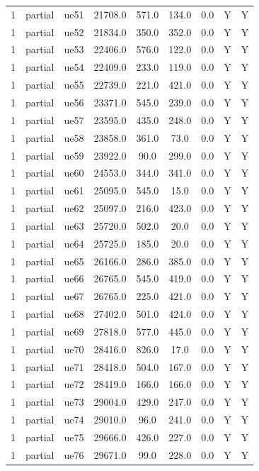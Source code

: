 \begin{table}[ht]
\begin{tabular}{|c|c|c|c|c|c|c|c|c|}
1 & partial & ue51 & 21708.0 & 571.0 & 134.0 & 0.0 & Y & Y \\
1 & partial & ue52 & 21834.0 & 350.0 & 352.0 & 0.0 & Y & Y \\
1 & partial & ue53 & 22406.0 & 576.0 & 122.0 & 0.0 & Y & Y \\
1 & partial & ue54 & 22409.0 & 233.0 & 119.0 & 0.0 & Y & Y \\
1 & partial & ue55 & 22739.0 & 221.0 & 421.0 & 0.0 & Y & Y \\
1 & partial & ue56 & 23371.0 & 545.0 & 239.0 & 0.0 & Y & Y \\
1 & partial & ue57 & 23595.0 & 435.0 & 248.0 & 0.0 & Y & Y \\
1 & partial & ue58 & 23858.0 & 361.0 & 73.0 & 0.0 & Y & Y \\
1 & partial & ue59 & 23922.0 & 90.0 & 299.0 & 0.0 & Y & Y \\
1 & partial & ue60 & 24553.0 & 344.0 & 341.0 & 0.0 & Y & Y \\
1 & partial & ue61 & 25095.0 & 545.0 & 15.0 & 0.0 & Y & Y \\
1 & partial & ue62 & 25097.0 & 216.0 & 423.0 & 0.0 & Y & Y \\
1 & partial & ue63 & 25720.0 & 502.0 & 20.0 & 0.0 & Y & Y \\
1 & partial & ue64 & 25725.0 & 185.0 & 20.0 & 0.0 & Y & Y \\
1 & partial & ue65 & 26166.0 & 286.0 & 385.0 & 0.0 & Y & Y \\
1 & partial & ue66 & 26765.0 & 545.0 & 419.0 & 0.0 & Y & Y \\
1 & partial & ue67 & 26765.0 & 225.0 & 421.0 & 0.0 & Y & Y \\
1 & partial & ue68 & 27402.0 & 501.0 & 424.0 & 0.0 & Y & Y \\
1 & partial & ue69 & 27818.0 & 577.0 & 445.0 & 0.0 & Y & Y \\
1 & partial & ue70 & 28416.0 & 826.0 & 17.0 & 0.0 & Y & Y \\
1 & partial & ue71 & 28418.0 & 504.0 & 167.0 & 0.0 & Y & Y \\
1 & partial & ue72 & 28419.0 & 166.0 & 166.0 & 0.0 & Y & Y \\
1 & partial & ue73 & 29004.0 & 429.0 & 247.0 & 0.0 & Y & Y \\
1 & partial & ue74 & 29010.0 & 96.0 & 241.0 & 0.0 & Y & Y \\
1 & partial & ue75 & 29666.0 & 426.0 & 227.0 & 0.0 & Y & Y \\
1 & partial & ue76 & 29671.0 & 99.0 & 228.0 & 0.0 & Y & Y \\

\end{tabular}
\end{table}
